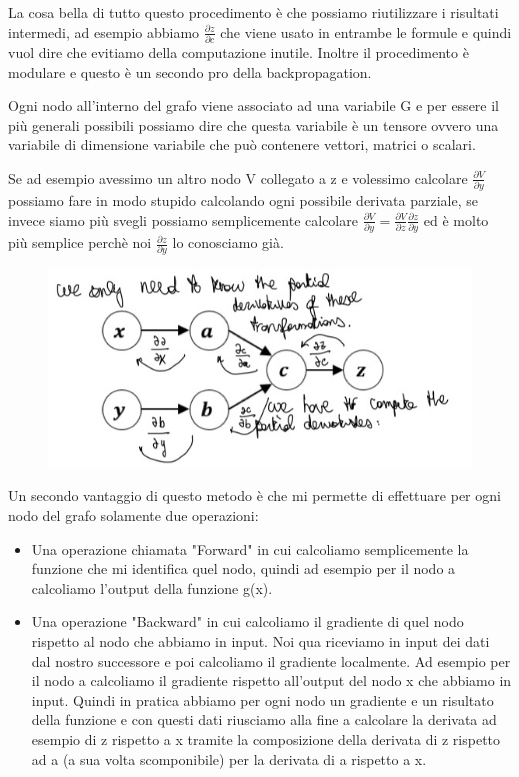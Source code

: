 \documentclass[14pt]{extreport}
\begin{document}
La cosa bella di tutto questo procedimento è che possiamo riutilizzare i risultati intermedi, ad esempio abbiamo $\frac{\partial z}{\partial c}$ che
viene usato in entrambe le formule e quindi vuol dire che evitiamo della computazione inutile. Inoltre il procedimento è modulare e questo è un
secondo pro della backpropagation.

Ogni nodo all'interno del grafo viene associato ad una variabile G e per essere il più generali possibili possiamo dire che questa
variabile è un tensore ovvero una variabile di dimensione variabile che può contenere vettori, matrici o scalari.

Se ad esempio avessimo un altro nodo V collegato a z e volessimo calcolare $\frac{\partial V}{\partial y}$ possiamo fare in modo stupido calcolando
ogni possibile derivata parziale, se invece siamo più svegli possiamo semplicemente calcolare $\frac{\partial V}{\partial y} = \frac{\partial
V}{\partial z}\frac{\partial z}{\partial y}$ ed è molto più semplice perchè noi $\frac{\partial z}{\partial y}$ lo conosciamo già.

\begin{figure}[H]
\centering
\includegraphics[width=0.7\linewidth]{388.jpeg}
\end{figure}

Un secondo vantaggio di questo metodo è che mi permette di effettuare per ogni nodo del grafo solamente due operazioni:
\begin{itemize}
\item Una operazione chiamata "Forward" in cui calcoliamo semplicemente la funzione che mi identifica quel nodo, quindi ad esempio per il nodo a
calcoliamo l'output della funzione g(x).
\item Una operazione "Backward" in cui calcoliamo il gradiente di quel nodo rispetto al nodo che abbiamo in input. Noi qua riceviamo in input dei dati
dal nostro successore e poi calcoliamo il gradiente localmente. Ad esempio per il nodo a calcoliamo il gradiente rispetto all'output del nodo x che
abbiamo in input. Quindi in pratica abbiamo per ogni nodo un gradiente e un risultato della funzione e con questi dati riusciamo alla fine a calcolare
la derivata ad esempio di z rispetto a x tramite la composizione della derivata di z rispetto ad a (a sua volta scomponibile) per la derivata di a
rispetto a x.
\end{itemize}
\end{document}

